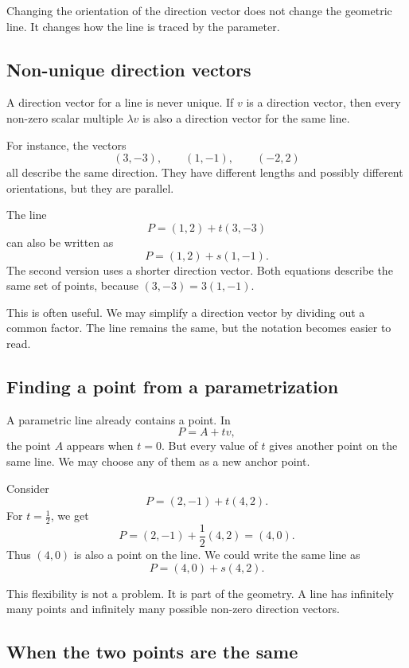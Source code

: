 \begin{remarkbox}
Changing the orientation of the direction vector does not change the geometric line. It changes how the line is traced by the parameter.
\end{remarkbox}

\subsection*{Non-unique direction vectors}

A direction vector for a line is never unique. If \(v\) is a direction vector, then every non-zero scalar multiple \(\lambda v\) is also a direction vector for the same line.

For instance, the vectors
\[
(3,-3),
\qquad
(1,-1),
\qquad
(-2,2)
\]
all describe the same direction. They have different lengths and possibly different orientations, but they are parallel.

\begin{examplebox}
The line
\[
P=(1,2)+t(3,-3)
\]
can also be written as
\[
P=(1,2)+s(1,-1).
\]
The second version uses a shorter direction vector. Both equations describe the same set of points, because \((3,-3)=3(1,-1)\).
\end{examplebox}

This is often useful. We may simplify a direction vector by dividing out a common factor. The line remains the same, but the notation becomes easier to read.

\subsection*{Finding a point from a parametrization}

A parametric line already contains a point. In
\[
P=A+t v,
\]
the point \(A\) appears when \(t=0\). But every value of \(t\) gives another point on the same line. We may choose any of them as a new anchor point.

\begin{examplebox}
Consider
\[
P=(2,-1)+t(4,2).
\]
For \(t=\frac12\), we get
\[
P=(2,-1)+\frac12(4,2)=(4,0).
\]
Thus \((4,0)\) is also a point on the line. We could write the same line as
\[
P=(4,0)+s(4,2).
\]
\end{examplebox}

This flexibility is not a problem. It is part of the geometry. A line has infinitely many points and infinitely many possible non-zero direction vectors.

\subsection*{When the two points are the same}

